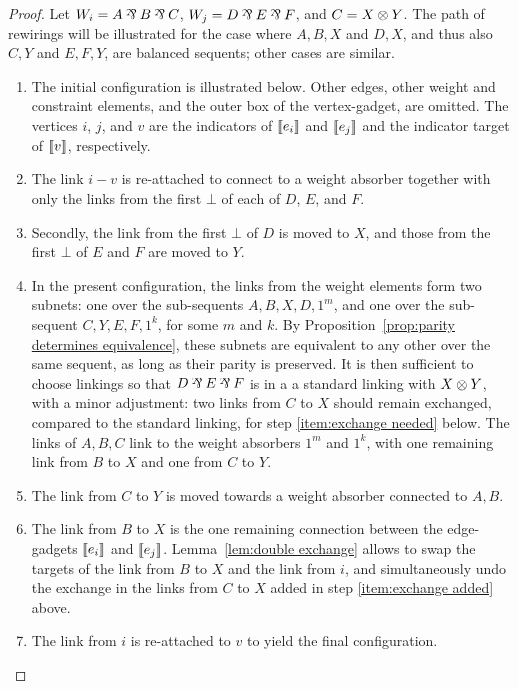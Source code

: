 \documentclass{sigplanconf}
\begin{document}
\begin{proof}
Let $W_i=A\parr B\parr C$, $W_j=D\parr E\parr F$, and $C=X\otimes Y$.
%
The path of rewirings will be illustrated for the case where $A,B,X$ and $D,X$, and thus also $C,Y$ and $E,F,Y$, are balanced sequents; other cases are similar.
%
\begin{enumerate}
	\item
The initial configuration is illustrated below. 
%
Other edges, other weight and constraint elements, and the outer box of the vertex-gadget, are omitted.
%
The vertices $i$, $j$, and  $v$ are the indicators of $\llbracket e_i\rrbracket$ and $\llbracket e_j\rrbracket$ and the indicator target of $\llbracket v\rrbracket$, respectively.
%


	\item
The link $i-v$ is re-attached to connect to a weight absorber together with only the links from the first $\bot$ of each of $D$, $E$, and $F$. 
%


	\item
Secondly, the link from the first $\bot$ of $D$ is moved to $X$, and those from the first $\bot$ of $E$ and $F$ are moved to $Y$.
%


	\item\label{item:exchange added}
In the present configuration, the links from the weight elements form two subnets: one over the sub-sequents $A,B,X,D,1^m$, and one over the sub-sequent $C,Y,E,F,1^k$, for some $m$ and $k$.
%
By Proposition~\ref{prop:parity determines equivalence}, these subnets are equivalent to any other over the same sequent, as long as their parity is preserved.
%
It is then sufficient to choose linkings so that $D\parr E\parr F$ is in a a standard linking with $X\otimes Y$, with a minor adjustment: two links from $C$ to $X$ should remain exchanged, compared to the standard linking, for step \ref{item:exchange needed} below.
%
The links of $A,B,C$ link to the weight absorbers $1^m$ and $1^k$, with one remaining link from $B$ to $X$ and one from $C$ to $Y$.
%
\displayOcto{\octorollC}


	\item
The link from $C$ to $Y$ is moved towards a weight absorber connected to $A,B$.
%


	\item\label{item:exchange needed}
The link from $B$ to $X$ is the one remaining connection between the edge-gadgets $\llbracket e_i\rrbracket$ and $\llbracket e_j\rrbracket$.
%
Lemma~\ref{lem:double exchange} allows to swap the targets of the link from $B$ to $X$ and the link from $i$, and simultaneously undo the exchange in the links from $C$ to $X$ added in step \ref{item:exchange added} above.
%


	\item
The link from $i$ is re-attached to $v$ to yield the final configuration.
%
\end{enumerate}
\end{proof}
\end{document}
